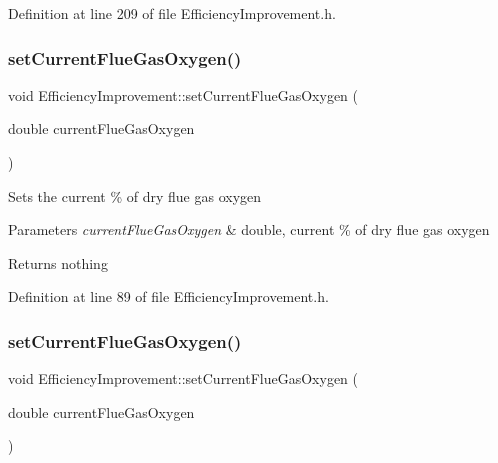 Definition at line 209 of file Efficiency\+Improvement.\+h.

\mbox{\label{class_efficiency_improvement_a038c378d51a5baf96521012a572bb106}} 
\subsubsection{\texorpdfstring{set\+Current\+Flue\+Gas\+Oxygen()}{setCurrentFlueGasOxygen()}\hspace{0.1cm}{\footnotesize\ttfamily [1/3]}}
{\footnotesize\ttfamily void Efficiency\+Improvement\+::set\+Current\+Flue\+Gas\+Oxygen (\begin{DoxyParamCaption}\item[{double}]{current\+Flue\+Gas\+Oxygen }\end{DoxyParamCaption})\hspace{0.3cm}{\ttfamily [inline]}}

Sets the current \% of dry flue gas oxygen


\begin{DoxyParams}{Parameters}
{\em current\+Flue\+Gas\+Oxygen} & double, current \% of dry flue gas oxygen\\
\hline
\end{DoxyParams}
\begin{DoxyReturn}{Returns}
nothing 
\end{DoxyReturn}


Definition at line 89 of file Efficiency\+Improvement.\+h.

\mbox{\label{class_efficiency_improvement_a038c378d51a5baf96521012a572bb106}} 
\subsubsection{\texorpdfstring{set\+Current\+Flue\+Gas\+Oxygen()}{setCurrentFlueGasOxygen()}\hspace{0.1cm}{\footnotesize\ttfamily [2/3]}}
{\footnotesize\ttfamily void Efficiency\+Improvement\+::set\+Current\+Flue\+Gas\+Oxygen (\begin{DoxyParamCaption}\item[{double}]{current\+Flue\+Gas\+Oxygen }\end{DoxyParamCaption})\hspace{0.3cm}{\ttfamily [inline]}}

